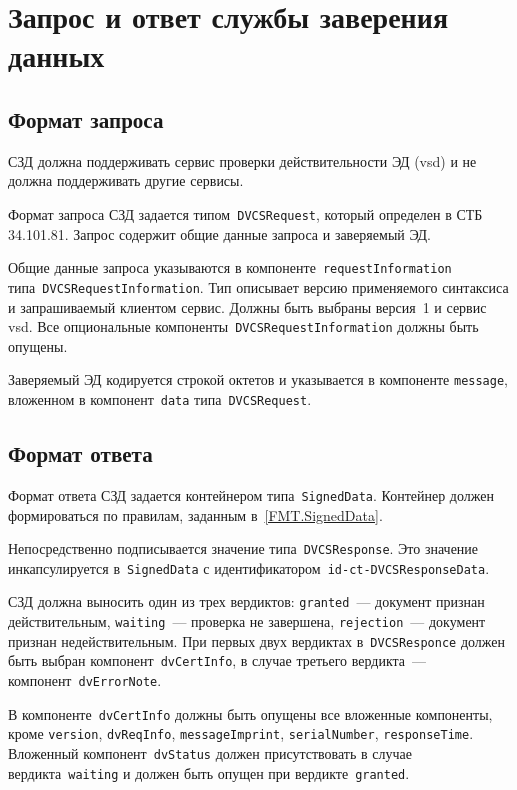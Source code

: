 \section{Запрос и ответ службы заверения данных}\label{FMT.DVCS}

\subsection{Формат запроса}\label{FMT.DVCS.Req}

СЗД должна поддерживать сервис проверки действительности ЭД (vsd) и не 
должна поддерживать другие сервисы.

Формат запроса СЗД задается типом~\texttt{DVCSRequest}, который определен  
в СТБ 34.101.81. Запрос содержит общие данные запроса и заверяемый ЭД.

Общие данные запроса указываются в компоненте~\texttt{requestInformation}
типа~\texttt{DVCSRequestInformation}. Тип описывает версию 
применяемого синтаксиса и запрашиваемый клиентом сервис. 
Должны быть выбраны версия~1 и сервис vsd. Все опциональные 
компоненты~\texttt{DVCSRequestInformation} должны быть опущены.

Заверяемый ЭД кодируется строкой октетов 
и указывается в компоненте \texttt{message}, вложенном в 
компонент~\texttt{data} типа~\texttt{DVCSRequest}.

\subsection{Формат ответа}\label{FMT.DVCS.Resp}

Формат ответа СЗД задается контейнером типа~\texttt{SignedData}.
Контейнер должен формироваться по правилам, заданным в~\ref{FMT.SignedData}. 
 
Непосредственно подписывается значение типа~\texttt{DVCSResponse}.
Это значение инкапсулируется в~\texttt{SignedData} с 
идентификатором~\texttt{id-ct-DVCSResponseData}.

СЗД должна выносить один из трех вердиктов:
\texttt{granted}~--- документ признан действительным,
\texttt{waiting}~--- проверка не завершена,
\texttt{rejection}~--- документ признан недействительным.
%
При первых двух вердиктах в~\texttt{DVCSResponce}
должен быть выбран компонент~\texttt{dvCertInfo},
в случае третьего вердикта~--- компонент~\texttt{dvErrorNote}.

В компоненте~\texttt{dvCertInfo} должны быть опущены все вложенные 
компоненты, кроме \texttt{version}, \texttt{dvReqInfo}, \texttt{messageImprint}, 
\texttt{serialNumber}, \texttt{responseTime}.
Вложенный компонент~\texttt{dvStatus} должен присутствовать в случае 
вердикта~\texttt{waiting} и должен быть опущен при 
вердикте~\texttt{granted}. 

